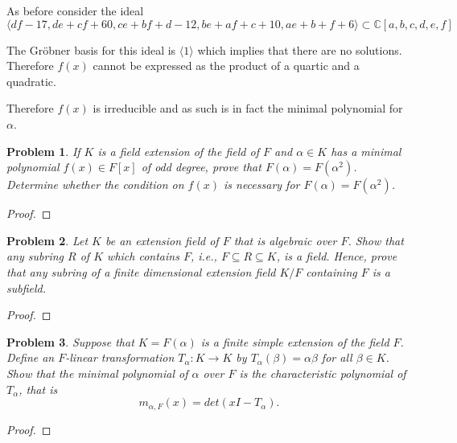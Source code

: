 \documentclass[10pt]{article}
\newcommand{\sk}{\vskip 10mm}
\newcommand{\bb}[1]{\mathbb{#1}}
\theoremstyle{plain}
\newtheorem{problem}{Problem}
\theoremstyle{remark}
\begin{document}
As before consider the ideal
\[ \langle d f - 17, d e + c f + 60, c e + b f + d - 12, b e + a f + c + 10, a e + b + f + 6\rangle
  \subset \bb{C}[a,b,c,d,e,f] \]

The Gr\"obner basis for this ideal is $\langle 1\rangle$ which implies that there are no solutions.
Therefore $f(x)$ cannot be expressed as the product of a quartic and a quadratic.

Therefore $f(x)$ is irreducible and as such is in fact the minimal polynomial for $\alpha$.

\sk

\begin{problem}
  If $K$ is a field extension of the field of $F$ and
  $\alpha \in K$ has a minimal polynomial $f(x) \in F[x]$ of odd degree,
  prove that $F(\alpha) = F(\alpha^2)$. Determine whether the condition
  on $f(x)$ is necessary for $F(\alpha) = F(\alpha^2)$.
\end{problem}

\begin{proof}
  
\end{proof}

\sk

\begin{problem}{6}
  Let $K$ be an extension field of $F$ that is algebraic over $F$.
  Show that any subring $R$ of $K$ which contains $F$, i.e.,
  $F \subseteq R \subseteq K$, is a field. Hence, prove that any subring of
  a finite dimensional extension field $K/F$ containing $F$ is a subfield.
\end{problem}

\begin{proof}
  
\end{proof}

\sk

\begin{problem}{7}
  Suppose that $K = F(\alpha)$ is a finite simple extension of the field $F$.
  Define an $F$-linear transformation
  $T_\alpha: K \to K$ by $T_\alpha (\beta) = \alpha\beta$ for all $\beta \in K$.
  Show that the minimal polynomial of $\alpha$ over $F$ is the characteristic
  polynomial of $T_\alpha$, that is
  \begin{equation*}
    m_{\alpha, F}(x) = det(xI - T_\alpha).
  \end{equation*}
\end{problem}

\begin{proof}
  
\end{proof}

\end{document}

